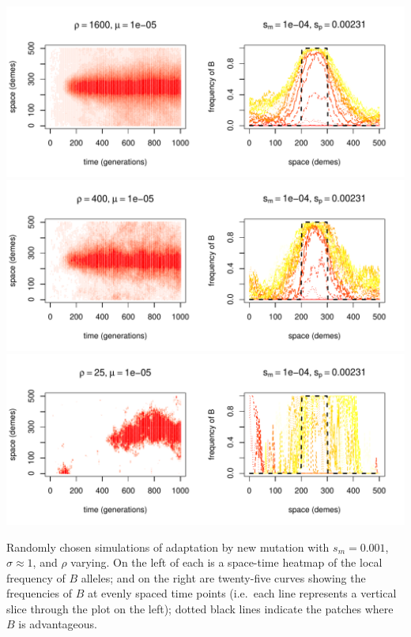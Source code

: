 \documentclass{article}
\begin{document}
\begin{sfigure}
  \begin{center}
    \includegraphics{example-mutation-sims/15449-r1-501-sb0_01-sm-1e-04-N1600-pophistory-run}
    \includegraphics{example-mutation-sims/5582-r1-501-sb0_01-sm-1e-04-N400-pophistory-run}
    \includegraphics{example-mutation-sims/24639-r1-501-sb0_01-sm-1e-04-N25-pophistory-run}
  \end{center}
  \caption{
    Randomly chosen simulations of adaptation by new mutation
    with $s_m=0.001$, $\sigma\approx 1$, and $\rho$ varying.
    On the left of each is a space-time heatmap of the local frequency of $B$ alleles;
    and on the right are twenty-five curves showing the frequencies of $B$ at evenly spaced time points
    (i.e.\ each line represents a vertical slice through the plot on the left);
    dotted black lines indicate the patches where $B$ is advantageous.
  } \label{sfig:sims_4}
\end{sfigure}
\end{document}

